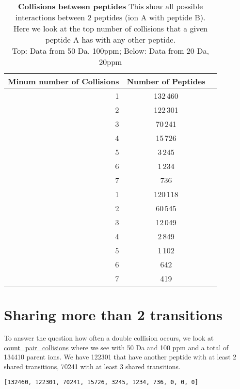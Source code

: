 \begin{table}[h]

\centering
\caption[Collisions between peptides]
{\textbf{Collisions between peptides} This show all possible interactions
between 2 peptides (ion A with peptide B). \\
Here we look at the top number of collisions that a given peptide A has with
any other peptide. \\
Top: Data from 50 Da, 100ppm; Below: Data from 20 Da, 20ppm
}
\label{tab:yeast_doublecollisions_peptide}

\begin{tabular}{ r c c }
\maketablespace
Minum number of Collisions & Number of Peptides \\
\toprule

1 & \phantom{}132\,460 \\
2 & \phantom{}122\,301 \\
3 & \phantom{}70\,241 \\
4 & \phantom{}15\,726 \\
5 & 3\,245 \\
6 & 1\,234 \\
7 & \phantom{1\,}736 \\

\midrule

1 & \phantom{}120\,118 \\
2 & \phantom{}60\,545 \\
3 & \phantom{}12\,049 \\
4 & 2\,849 \\
5 & 1\,102 \\
6 & \phantom{1\,}642 \\
7 & \phantom{1\,}419 \\


\end{tabular}
\end{table}



\clearpage


\section{Sharing more than 2 transitions}
To answer the question how often a double collision occurs, we look at
\url{count_pair_collisions} where we see with 50 Da and 100 ppm and a total of
134410 parent ions. We have 122301 that have another peptide with at least 2
shared transitions, 70241 with at least 3 shared transitions.

\begin{verbatim}
[132460, 122301, 70241, 15726, 3245, 1234, 736, 0, 0, 0]
\end{verbatim}

